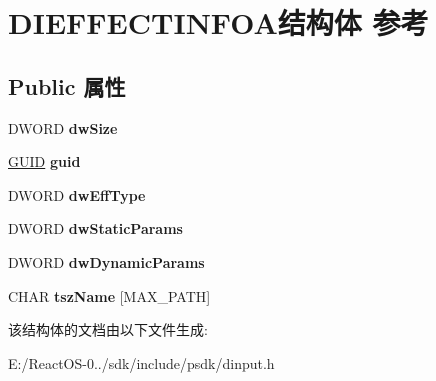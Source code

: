 \hypertarget{struct_d_i_e_f_f_e_c_t_i_n_f_o_a}{}\section{D\+I\+E\+F\+F\+E\+C\+T\+I\+N\+F\+O\+A结构体 参考}
\label{struct_d_i_e_f_f_e_c_t_i_n_f_o_a}
\subsection*{Public 属性}
\begin{DoxyCompactItemize}
\item 
\mbox{\label{struct_d_i_e_f_f_e_c_t_i_n_f_o_a_a3d5856b350d243827f2cf254d06c1f8f}} 
D\+W\+O\+RD {\bfseries dw\+Size}
\item 
\mbox{\label{struct_d_i_e_f_f_e_c_t_i_n_f_o_a_a5bb7d2e866655b1dbf8d6d8701a79ddd}} 
\hyperlink{interface_g_u_i_d}{G\+U\+ID} {\bfseries guid}
\item 
\mbox{\label{struct_d_i_e_f_f_e_c_t_i_n_f_o_a_a607591b7d095f48998a156301fa5e084}} 
D\+W\+O\+RD {\bfseries dw\+Eff\+Type}
\item 
\mbox{\label{struct_d_i_e_f_f_e_c_t_i_n_f_o_a_a167bf6dbc98d9c1574f28453163bf850}} 
D\+W\+O\+RD {\bfseries dw\+Static\+Params}
\item 
\mbox{\label{struct_d_i_e_f_f_e_c_t_i_n_f_o_a_aba27999c4ff2ff6a53ad9da067704b94}} 
D\+W\+O\+RD {\bfseries dw\+Dynamic\+Params}
\item 
\mbox{\label{struct_d_i_e_f_f_e_c_t_i_n_f_o_a_aef03846d4720ea37062c463d83cee771}} 
C\+H\+AR {\bfseries tsz\+Name} \mbox{[}M\+A\+X\+\_\+\+P\+A\+TH\mbox{]}
\end{DoxyCompactItemize}


该结构体的文档由以下文件生成\+:\begin{DoxyCompactItemize}
\item 
E\+:/\+React\+O\+S-\/0../sdk/include/psdk/dinput.\+h\end{DoxyCompactItemize}
